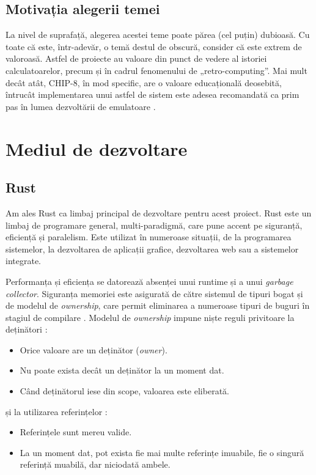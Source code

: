 \documentclass[a4paper]{article}
\begin{document}
\subsection{Motivația alegerii temei}
La nivel de suprafață, alegerea acestei teme poate părea (cel puțin) dubioasă. Cu toate că este, într-adevăr, o temă destul de obscură, consider
că este extrem de valoroasă. Astfel de proiecte au valoare din punct de vedere al istoriei calculatoarelor, precum și în cadrul fenomenului de
„retro-computing”. Mai mult decât atât, CHIP-8, în mod specific, are o valoare educațională deosebită, întrucât implementarea unui astfel de
sistem este adesea recomandată ca prim pas în lumea dezvoltării de emulatoare \cite{langhoff}.


\section{Mediul de dezvoltare}
\subsection{Rust}
Am ales Rust ca limbaj principal de dezvoltare pentru acest proiect. Rust este un limbaj de programare general, multi-paradigmă, care pune accent
pe siguranță, eficiență și paralelism. Este utilizat în numeroase situații, de la programarea sistemelor, la dezvoltarea de aplicații grafice, dezvoltarea
web sau a sistemelor integrate.

Performanța și eficiența se datorează absenței unui runtime și a unui \textit{garbage collector}. Siguranța memoriei este asigurată de către sistemul
de tipuri bogat și de modelul de \textit{ownership}, care permit eliminarea a numeroase tipuri de buguri în stagiul de compilare \cite{rsorg}. Modelul
de \textit{ownership} impune niște reguli privitoare la deținători \cite[Cap.~4.1]{rustbook}:
\begin{itemize}
	\item Orice valoare are un deținător (\textit{owner}).
	\item Nu poate exista decât un deținător la un moment dat.
	\item Când deținătorul iese din scope, valoarea este eliberată.
\end{itemize}
și la utilizarea referințelor \cite[Cap.~4.2]{rustbook}:
\begin{itemize}
	\item Referințele sunt mereu valide.
	\item La un moment dat, pot exista fie mai multe referințe imuabile, fie o singură referință muabilă, dar niciodată ambele.
\end{itemize}
\end{document}
